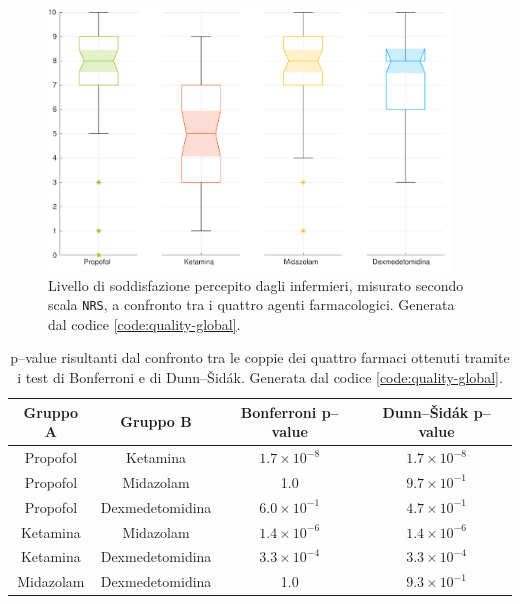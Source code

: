 
\vfill

\begin{figure}[!h]
    \centering
    \includegraphics[width=0.95\textwidth]{Figure/qualita-colorful.pdf}
    \caption{Livello di soddisfazione percepito dagli infermieri, misurato secondo scala \texttt{NRS}, a confronto tra i quattro agenti farmacologici. Generata dal codice \ref{code:quality-global}.}
    \label{fig:qualitascolorful}
\end{figure}

\vfill\vfill


\bgroup
\def\arraystretch{1.5}
\begin{table}[!h]
    \centering
    \begin{tabular}{c|c|c|c}
         Gruppo A & Gruppo B & Bonferroni p--value & Dunn--Šidák p--value\\ \hline
       Propofol & Ketamina & $1.7\times10^{-8}$ & $1.7\times10^{-8}$ \\
       Propofol & Midazolam  & 1.0 & $9.7 \times 10^{-1}$\\
       Propofol & Dexmedetomidina & $6.0 \times 10^{-1}$ & $4.7 \times 10^{-1}$\\
       Ketamina & Midazolam & $1.4\times10^{-6}$ & $1.4\times10^{-6}$\\
       Ketamina & Dexmedetomidina & $3.3\times10^{-4}$ & $3.3\times10^{-4}$\\
       Midazolam & Dexmedetomidina & 1.0 & $9.3 \times 10^{-1}$\\
       
    \end{tabular}
    \caption{p--value risultanti dal confronto tra le coppie dei quattro farmaci ottenuti tramite i test di Bonferroni e di Dunn--Šidák. Generata dal codice \ref{code:quality-global}.}
    \label{tab:qualitatest}
\end{table}
\egroup


